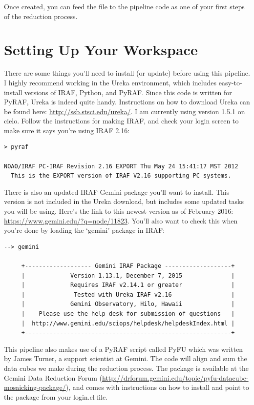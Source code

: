\documentclass[12pt]{report}
\begin{document}
\noindent Once created, you can feed the file to the pipeline code as one of your first steps of the reduction process.

\chapter{Setting Up Your Workspace}

There are some things you'll need to install (or update) before using this pipeline. I highly recommend working in the Ureka environment, which includes easy-to-install versions of IRAF, Python, and PyRAF. Since this code is written for PyRAF, Ureka is indeed quite handy. Instructions on how to download Ureka can be found here: \url{http://ssb.stsci.edu/ureka/}. I am currently using version 1.5.1 on cielo. Follow the instructions for making IRAF, and check your login screen to make sure it says you're using IRAF 2.16:

\begin{verbatim}
> pyraf

NOAO/IRAF PC-IRAF Revision 2.16 EXPORT Thu May 24 15:41:17 MST 2012
  This is the EXPORT version of IRAF V2.16 supporting PC systems.
\end{verbatim}

There is also an updated IRAF Gemini package you'll want to install. This version is not included in the Ureka download, but includes some updated tasks you will be using. Here's the link to this newest version as of February 2016: \url{https://www.gemini.edu/?q=node/11823}. You'll also want to check this when you're done by loading the `gemini' package in IRAF:

\begin{verbatim}
--> gemini

     +------------------- Gemini IRAF Package -------------------+
     |             Version 1.13.1, December 7, 2015              |
     |             Requires IRAF v2.14.1 or greater              |
     |              Tested with Ureka IRAF v2.16                 |
     |             Gemini Observatory, Hilo, Hawaii              |
     |    Please use the help desk for submission of questions   |
     |  http://www.gemini.edu/sciops/helpdesk/helpdeskIndex.html |
     +-----------------------------------------------------------+
\end{verbatim}

This pipeline also makes use of a PyRAF script called PyFU which was written by James Turner, a support scientist at Gemini. The code will align and sum the data cubes we make during the reduction process. The package is available at the Gemini Data Reduction Forum (\url{http://drforum.gemini.edu/topic/pyfu-datacube-mosaicking-package/}), and comes with instructions on how to install and point to the package from your login.cl file.
\end{document}
